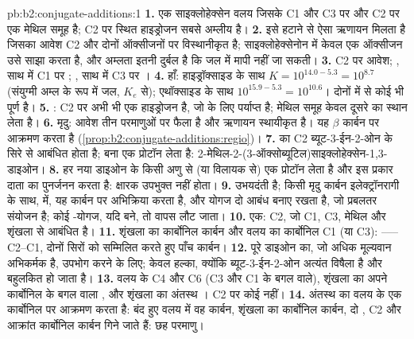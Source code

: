 \begin{solution}{pb:b2:conjugate-additions:1}
\textbf{1.} एक साइक्लोहेक्सेन वलय जिसके C1 और C3 पर  और C2 पर एक मेथिल समूह है; C2 पर स्थित हाइड्रोजन
सबसे अम्लीय है।
\textbf{2.} इसे हटाने से ऐसा ऋणायन मिलता है जिसका आवेश C2 और दोनों ऑक्सीजनों पर विस्थानीकृत है;
साइक्लोहेक्सेनोन में केवल एक ऑक्सीजन उसे साझा करता है, और अम्लता इतनी दुर्बल है कि जल में मापी नहीं जा सकती।
\textbf{3.} C2 पर आवेश; , साथ में C1 पर ; , साथ में C3 पर ।
\textbf{4.} हाँ: हाइड्रॉक्साइड के साथ $K = 10^{14.0 - 5.3} = 10^{8.7}$ (संयुग्मी अम्ल के रूप में जल,
$K_e$ से); एथॉक्साइड के साथ $10^{15.9-5.3} = 10^{10.6}$। दोनों में से कोई भी पूर्ण है।
\textbf{5.} : C2 पर अभी भी एक हाइड्रोजन है, जो  के लिए पर्याप्त है; मेथिल
समूह केवल दूसरे का स्थान लेता है।
\textbf{6.} मृदु: आवेश तीन परमाणुओं पर फैला है और ऋणायन स्थायीकृत है। यह
$\beta$ कार्बन पर आक्रमण करता है (\cref{prop:b2:conjugate-additions:regio})।
\textbf{7.}  का C2 ब्यूट-3-ईन-2-ओन के  सिरे से आबंधित होता है; बना  एक
प्रोटॉन लेता है: 2-मेथिल-2-(3-ऑक्सोब्यूटिल)साइक्लोहेक्सेन-1,3-डाइओन।
\textbf{8.} हर नया  डाइओन के किसी अणु से (या विलायक से) एक प्रोटॉन लेता है और इस प्रकार
दाता  का पुनर्जनन करता है: क्षारक उपभुक्त नहीं होता।
\textbf{9.}  उभयदंती है; किसी मृदु कार्बन इलेक्ट्रॉनरागी के साथ,  में, यह कार्बन पर
अभिक्रिया करता है, और  योगज दो  आबंध बनाए रखता है, जो प्रबलतर संयोजन है; कोई
-योगज, यदि बने, तो वापस लौट जाता।
\textbf{10.} एक: C2, जो C1, C3, मेथिल और शृंखला से आबंधित है।
\textbf{11.} शृंखला का कार्बोनिल कार्बन और वलय का कार्बोनिल C1 (या C3): ------C2--C1,
दोनों सिरों को सम्मिलित करते हुए पाँच कार्बन।
\textbf{12.} पूरे डाइओन का, जो अधिक मूल्यवान अभिकर्मक है, उपभोग करने के लिए; केवल हल्का, क्योंकि ब्यूट-3-ईन-2-ओन
अत्यंत विषैला है और बहुलकित हो जाता है।
\textbf{13.} वलय के C4 और C6 (C3 और C1 के बगल वाले), शृंखला का अपने कार्बोनिल के बगल वाला , और शृंखला का
अंतस्थ । C2 पर कोई नहीं।
\textbf{14.} अंतस्थ  का  वलय के एक कार्बोनिल पर आक्रमण करता है: बंद हुए वलय में वह
कार्बन, शृंखला का कार्बोनिल कार्बन, दो , C2 और आक्रांत कार्बोनिल कार्बन गिने जाते हैं: छह परमाणु।

\end{solution}
